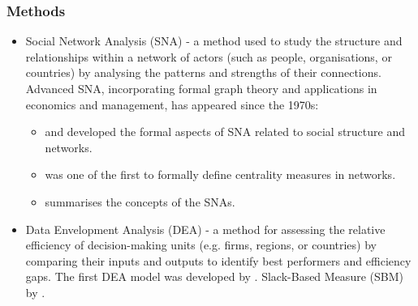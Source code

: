 \documentclass[aspectratio=169]{beamer}
\begin{document}
\begin{frame}
\frametitle{Methods}
    
    \begin{itemize}
        \item 
        Social Network Analysis (SNA) - a method used to study the structure and relationships within a network of actors (such as people, organisations, or countries) by analysing the patterns and strengths of their connections. Advanced SNA, incorporating formal graph theory and applications in economics and management, has appeared since the 1970s:
    \begin{itemize}
        \item \cite{LorrainWhite1971} and \cite{White1976} developed the formal aspects of SNA related to social structure and networks. %
        \item \cite{Freeman1979} was one of the first to formally define centrality measures in networks.
    \item \cite{barabasi2016network} summarises the concepts of the SNAs.   
    \end{itemize}
         
        \item 
        Data Envelopment Analysis (DEA) - a method for assessing the relative efficiency of decision-making units (e.g. firms, regions, or countries) by comparing their inputs and outputs to identify best performers and efficiency gaps. The first DEA model was developed by \cite{CCR1978}. Slack-Based Measure (SBM) by \cite{Tone2001}.
    \end{itemize}
\end{frame}
\end{document}
